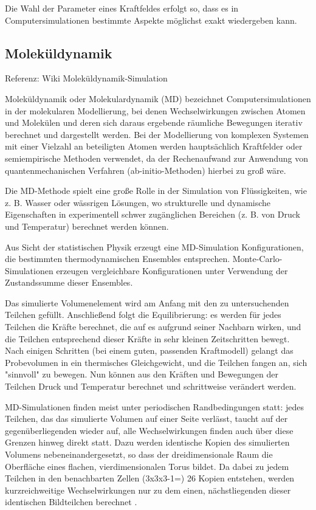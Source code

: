 \documentclass[]{article}
\begin{document}
Die Wahl der Parameter eines Kraftfeldes erfolgt so, dass es in Computersimulationen bestimmte Aspekte möglichst exakt wiedergeben kann.
 

\subsection{Moleküldynamik}
Referenz: Wiki Moleküldynamik-Simulation

Moleküldynamik oder Molekulardynamik (MD) bezeichnet Computersimulationen in der molekularen Modellierung, bei denen Wechselwirkungen zwischen Atomen und Molekülen und deren sich daraus ergebende räumliche Bewegungen iterativ berechnet und dargestellt werden. Bei der Modellierung von komplexen Systemen mit einer Vielzahl an beteiligten Atomen werden hauptsächlich Kraftfelder oder semiempirische Methoden verwendet, da der Rechenaufwand zur Anwendung von quantenmechanischen Verfahren (ab-initio-Methoden) hierbei zu groß wäre.

Die MD-Methode spielt eine große Rolle in der Simulation von Flüssigkeiten, wie z. B. Wasser oder wässrigen Lösungen, wo strukturelle und dynamische Eigenschaften in experimentell schwer zugänglichen Bereichen (z. B. von Druck und Temperatur) berechnet werden können.

Aus Sicht der statistischen Physik erzeugt eine MD-Simulation Konfigurationen, die bestimmten thermodynamischen Ensembles entsprechen.  Monte-Carlo-Simulationen erzeugen vergleichbare Konfigurationen unter Verwendung der Zustandssumme dieser Ensembles.

Das simulierte Volumenelement wird am Anfang mit den zu untersuchenden Teilchen gefüllt. Anschließend folgt die Equilibrierung: es werden für jedes Teilchen die Kräfte berechnet, die auf es aufgrund seiner Nachbarn wirken, und die Teilchen entsprechend dieser Kräfte in sehr kleinen Zeitschritten bewegt. Nach einigen Schritten (bei einem guten, passenden Kraftmodell) gelangt das Probevolumen in ein thermisches Gleichgewicht, und die Teilchen fangen an, sich "sinnvoll" zu bewegen. Nun können aus den Kräften und Bewegungen der Teilchen Druck und Temperatur berechnet und schrittweise verändert werden.

MD-Simulationen finden meist unter periodischen Randbedingungen statt: jedes Teilchen, das das simulierte Volumen auf einer Seite verlässt, taucht auf der gegenüberliegenden wieder auf, alle Wechselwirkungen finden auch über diese Grenzen hinweg direkt statt. Dazu werden identische Kopien des simulierten Volumens nebeneinandergesetzt, so dass der dreidimensionale Raum die Oberfläche eines flachen, vierdimensionalen Torus bildet. Da dabei zu jedem Teilchen in den benachbarten Zellen (3x3x3-1=) 26 Kopien entstehen, werden kurzreichweitige Wechselwirkungen nur zu dem einen, nächstliegenden dieser identischen Bildteilchen berechnet .
\end{document}
